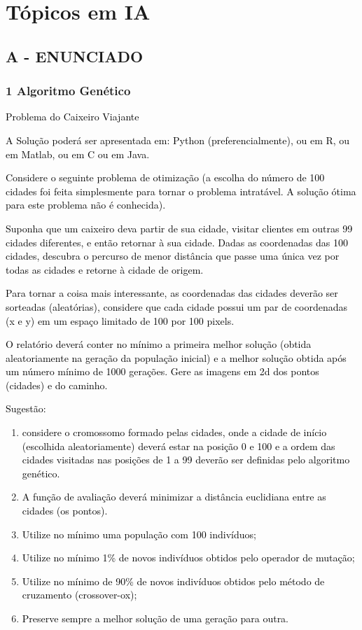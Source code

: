 \label{ap:ap15}
\chapter{Tópicos em IA}
\section*{\textbf{A - ENUNCIADO}}

\subsection*{\textbf{1 Algoritmo Genético}}


\textcolor{black}{Problema do Caixeiro Viajante}


\textcolor{black}{A Solução poderá ser apresentada em: Python (preferencialmente), ou em R, ou em Matlab, ou em C ou em
Java.}


\textcolor{black}{Considere o seguinte problema de otimização (a escolha do número de 100 cidades foi feita simplesmente
para tornar o problema intratável. A solução ótima para este problema não é conhecida).}


\textcolor{black}{Suponha que um caixeiro deva partir de sua cidade, visitar clientes em outras 99 cidades diferentes, e
então retornar à sua cidade. Dadas as coordenadas das 100 cidades, descubra o percurso de menor distância que passe uma
única vez por todas as cidades e retorne à cidade de origem.}


\textcolor{black}{Para tornar a coisa mais interessante, as coordenadas das cidades deverão ser sorteadas (aleatórias),
considere que cada cidade possui um par de coordenadas (x e y) em um espaço limitado de 100 por 100 pixels.}


\textcolor{black}{O relatório deverá conter no mínimo a primeira melhor solução (obtida aleatoriamente na geração da
população inicial) e a melhor solução obtida após um número mínimo de 1000 gerações. Gere as imagens em 2d dos pontos
(cidades) e do caminho.}


\textcolor{black}{Sugestão: }
\begin{enumerate}[series=listWWNumxxiii,label=(\arabic*),ref=\arabic*]
\item \textcolor{black}{considere o cromossomo formado pelas cidades, onde a cidade de início (escolhida aleatoriamente)
deverá estar na posição 0 e 100 e a ordem das cidades visitadas nas posições de 1 a 99 deverão ser definidas pelo
algoritmo genético.}
\item \textcolor{black}{A função de avaliação deverá minimizar a distância euclidiana entre as cidades (os pontos).}
\item \textcolor{black}{Utilize no mínimo uma população com 100 indivíduos;}
\item \textcolor{black}{Utilize no mínimo 1\% de novos indivíduos obtidos pelo operador de mutação;}
\item \textcolor{black}{Utilize no mínimo de 90\% de novos indivíduos obtidos pelo método de cruzamento (crossover-ox);}
\item \textcolor{black}{Preserve sempre a melhor solução de uma geração para outra.}
\end{enumerate}

